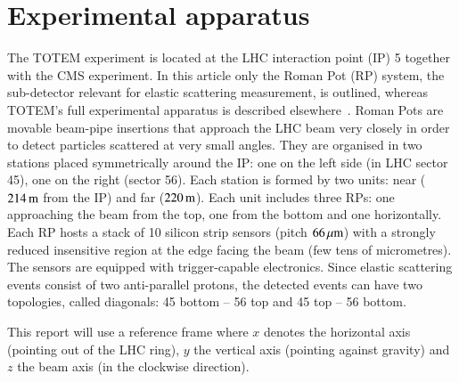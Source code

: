 \section{Experimental apparatus}
\label{sec:apparatus}

The TOTEM experiment is located at the LHC interaction point (IP) 5 together 
with the CMS experiment. In this article only the Roman Pot (RP) system, the 
sub-detector relevant for elastic scattering measurement, is outlined, 
whereas TOTEM's full experimental apparatus is described
elsewhere~\cite{totem-jinst}. 
Roman Pots are movable beam-pipe
insertions that approach the LHC beam very closely in order to detect particles scattered at very small angles. They are organised in two stations placed symmetrically around the IP: one on the left side (in LHC sector 45), one on the right (sector 56). Each station is formed by two units: near ($214\,{\rm m}$ from the IP) and far ($220\,{\rm m}$). Each unit includes three RPs: one approaching the beam from the top, one from the bottom and one horizontally. Each RP hosts a stack of 10 silicon strip sensors (pitch $66\,{\rm \mu m}$) with a strongly reduced insensitive region at the edge facing the beam (few tens of micrometres). The sensors are equipped with trigger-capable electronics. Since elastic scattering events consist of two anti-parallel protons, the detected events can have two topologies, called diagonals: 45 bottom -- 56 top and 45 top -- 56 bottom.

This report will use a reference frame where $x$ denotes the horizontal axis (pointing out of the LHC ring), $y$ the vertical axis (pointing against gravity) and $z$ the beam axis (in the clockwise direction).
